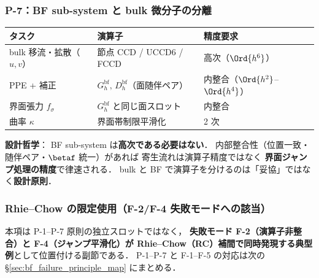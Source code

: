 \subsubsection{P-7：BF sub-system と bulk 微分子の分離}
\label{sec:bf_p7_separation}

\begin{center}
\begin{tabular}{@{}lll@{}}
\hline
タスク & 演算子 & 精度要求 \\
\hline
bulk 移流・拡散（$u,v$）& 節点 CCD / UCCD6 / FCCD & 高次（$\Ord{h^6}$） \\
PPE + 補正 & $G_h^\text{bf},\,D_h^\text{bf}$（面随伴ペア）& 内整合（$\Ord{h^2}$--$\Ord{h^4}$） \\
界面張力 $f_\sigma$ & $G_h^\text{bf}$ と同じ面スロット & 内整合 \\
曲率 $\kappa$ & 界面帯制限平滑化 & 2 次 \\
\hline
\end{tabular}
\end{center}

\noindent\textbf{設計哲学}：
BF sub-system は\textbf{高次である必要はない}．
内部整合性（位置一致・随伴ペア・$\betaf$ 統一）があれば
寄生流れは演算子精度ではなく
\textbf{界面ジャンプ処理の精度}で律速される．
bulk と BF で演算子を分けるのは「妥協」ではなく\textbf{設計原則}．

\subsubsection{Rhie--Chow の限定使用（F-2/F-4 失敗モードへの該当）}
\label{sec:bf_rhie_chow_restriction}

\noindent
本項は P-1--P-7 原則の独立スロットではなく，
\textbf{失敗モード F-2（演算子非整合）と F-4（ジャンプ平滑化）が
Rhie--Chow（RC）補間で同時発現する典型例}として位置付ける副節である．
P-1--P-7 と F-1--F-5 の対応は次の §\ref{sec:bf_failure_principle_map} にまとめる．

\medskip

